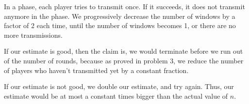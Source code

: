 \documentclass{article}
\begin{document}
In a phase, each player tries to transmit once. If it succeeds, it
does not transmit anymore in the phase. We progressively decrease the
number of windows by a factor of 2 each time, until the number of
windows becomes 1, or there are no more transmissions.

If our estimate is good, then the claim is, we would terminate before we run out
of the number of rounds, because as proved in problem 3, we reduce the number of
players who haven't transmitted yet by a constant fraction.

If our estimate is not good, we double our estimate, and try
again. Thus, our estimate would be at most a constant times bigger
than the actual value of $n$.
\end{document}
